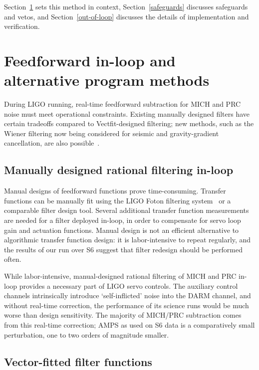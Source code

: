 Section~\ref{prior_programs} sets this method in context, Section~\ref{safeguards} discusses safeguards and vetos, and Section~\ref{out-of-loop} discusses the details of implementation and verification.

    \section{Feedforward in-loop and alternative program methods}
    \label{prior_programs}
   
        During LIGO running, real-time feedforward subtraction for MICH and PRC noise must meet operational constraints. Existing manually designed filters have certain tradeoffs compared to Vectfit-designed filtering; new methods, such as the Wiener filtering now being considered for seismic and gravity-gradient cancellation, are also possible~\cite{Driggers2012ActiveNoise}.
        
        \subsection{Manually designed rational filtering in-loop}
        \label{manual_design}

            Manual designs of feedforward functions prove time-consuming. Transfer functions can be manually fit using the LIGO Foton filtering system~\cite{Sigg2005} or a comparable filter design tool. Several additional transfer function measurements are needed for a filter deployed in-loop, in order to compensate for servo loop gain and actuation functions. Manual design is not an efficient alternative to algorithmic transfer function design: it is labor-intensive to repeat regularly, and the results of our run over S6 suggest that filter redesign should be performed often.

	While labor-intensive, manual-designed rational filtering of MICH and PRC in-loop provides a necessary part of LIGO servo controls. The auxiliary control channels intrinsically introduce `self-inflicted' noise into the DARM channel, and without real-time correction, the performance of its science runs would be much worse than design sensitivity. The majority of MICH/PRC subtraction comes from this real-time correction; AMPS as used on S6 data is a comparatively small perturbation, one to two orders of magnitude smaller.

        \subsection{Vector-fitted filter functions}
        \label{vectfit}

